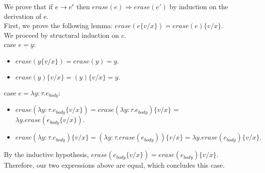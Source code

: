 \documentclass[10pt]{article}
\begin{document}
\begin{exercise}
%
%
We prove that if $e \rightarrow e'$ then
$\mathit{erase}(e) \Rightarrow \mathit{erase}(e')$ by induction on the derivation of e.\\

First, we prove the following lemma: $\mathit{erase}(e\{v/x\}) = \mathit{erase}(e)\{v/x\}$.\\
We proceed by structural induction on $e.$\\

{\sc case} $e = y$:
\begin{itemize}
\item $\mathit{erase}(y \{v/x\}) = \mathit{erase}(y) = y.$
\item $\mathit{erase}(y) \{v/x\} = (y)\{v/x\} = y.$\\

\checkmark
\end{itemize}

{\sc case} $e = \lambda y: \tau. e_{body}$:
\begin{itemize}
\item $\mathit{erase}(\lambda y: \tau. e_{body} \{v/x\}) = \mathit{erase}(\lambda y: \tau. e_{body})\{v/x\}$ 
= $\lambda y. \mathit{erase}(e_{body} \{v/x\}).$\\
\item $\mathit{erase}(\lambda y: \tau. e_{body}) \{v/x\} = (\lambda y: \tau. \mathit{erase} (e_{body})) \{v/x\} = \lambda y. \mathit{erase} (e_{body}) \{v/x\}.$\\

\end{itemize}

By the inductive hypothesis, $\mathit{erase}(e_{body}\{v/x\}) = \mathit{erase}(e_{body})\{v/x\}$. Therefore, our two expressions above are equal, which concludes this case. \checkmark\\


\end{exercise}
\end{document}
